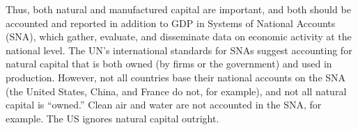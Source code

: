 





Thus, both natural and manufactured capital are important, 
and both should be accounted and reported in addition to GDP 
in Systems of National Accounts (SNA), which gather, evaluate, 
and disseminate data on economic activity at the national level. 
The UN's international standards for SNAs suggest
accounting for natural capital that is both owned 
(by firms or the government) and used in production.
However, not all countries base their national accounts on the SNA 
(the United States, China, and France do not, for example), 
and not all natural capital is ``owned.'' 
Clean air and water are not accounted in the SNA, for example. 
The US ignores natural capital outright.

